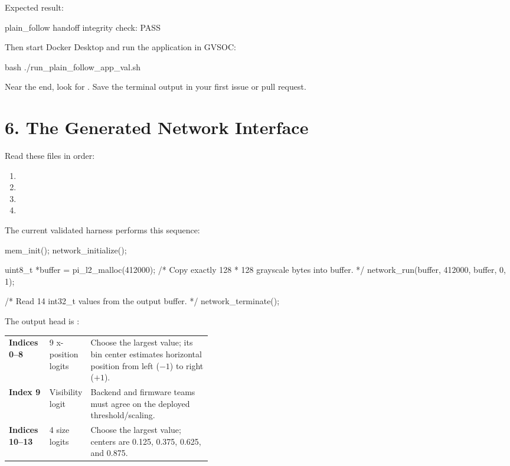 \documentclass[11pt]{article}
\begin{document}
Expected result:

\begin{Code}
plain_follow handoff integrity check: PASS
\end{Code}

Then start Docker Desktop and run the application in GVSOC:

\begin{Code}
bash ./run_plain_follow_app_val.sh
\end{Code}

Near the end, look for . Save the terminal output in your first issue or pull request.

\section{6. The Generated Network Interface}

Read these files in order:

\begin{enumerate}
\item {}
\item {}
\item {}
\item {}
\end{enumerate}

The current validated harness performs this sequence:

\begin{Code}
mem_init();
network_initialize();

uint8_t *buffer = pi_l2_malloc(412000);
/* Copy exactly 128 * 128 grayscale bytes into buffer. */
network_run(buffer, 412000, buffer, 0, 1);

/* Read 14 int32_t values from the output buffer. */
network_terminate();
\end{Code}

The output head is :

\begin{tabularx}{\linewidth}{>{\bfseries}p{0.20\linewidth}p{0.20\linewidth}X}
Indices 0--8 & 9 x-position logits & Choose the largest value; its bin center estimates horizontal position from left ($-1$) to right ($+1$). \\
Index 9 & Visibility logit & Backend and firmware teams must agree on the deployed threshold/scaling. \\
Indices 10--13 & 4 size logits & Choose the largest value; centers are 0.125, 0.375, 0.625, and 0.875. \\
\end{tabularx}
\end{document}
